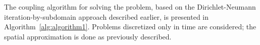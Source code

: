 \documentclass[11pt,english]{article}
\begin{document}

The coupling algorithm for solving the problem, based on the Dirichlet-Neumann iteration-by-subdomain approach described earlier, is presented in Algorithm~\ref{alg:algorithm1}. Problems discretized only in time are considered; the spatial approximation is done as previously described.
\end{document}
